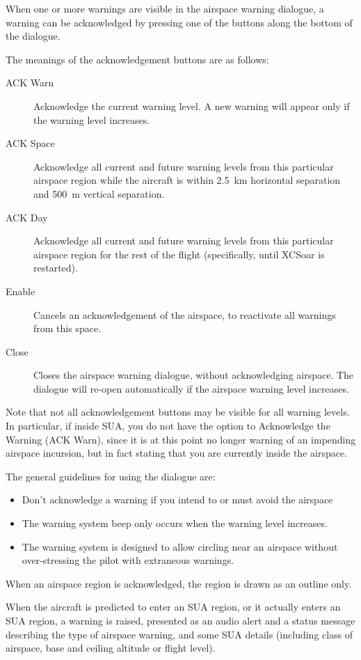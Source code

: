 When one or more warnings are visible in the airspace warning dialogue,
a warning can be acknowledged by pressing one of the buttons along the bottom
of the dialogue.

The meanings of the acknowledgement buttons are as follows:
\begin{description}
\item[ACK Warn]  Acknowledge the current warning level.  A new warning will appear
only if the warning level increases.
\item[ACK Space]  Acknowledge all current and future warning levels from this 
particular airspace region while the aircraft is within 2.5~km horizontal separation
and 500~m vertical separation.
\item[ACK Day]  Acknowledge all current and future warning levels from this particular
airspace region for the rest of the flight (specifically, until XCSoar
is restarted).
\item[Enable]  Cancels an acknowledgement of the airspace, to reactivate all warnings
from this space.
\item[Close] Closes the airspace warning dialogue, without acknowledging airspace.
  The dialogue will re-open automatically if the airspace warning level increases.
\end{description}

Note that not all acknowledgement buttons may be visible for all
warning levels.  In particular, if inside SUA, you do not have the
option to Acknowledge the Warning (ACK Warn), since it is at this
point no longer warning of an impending airspace incursion, but in
fact stating that you are currently inside the airspace.

The general guidelines for using the dialogue are:
\begin{itemize}
\item  Don't acknowledge a warning if you intend to or must avoid the airspace
\item  The warning system beep only occurs when the warning level increases.
\item  The warning system is designed to allow circling near an airspace without
  over-stressing the pilot with extraneous warnings.
\end{itemize}

When an airspace region is acknowledged, the region is drawn as an
outline only.

When the aircraft is predicted to enter an SUA region, or it actually
enters an SUA region, a warning is raised, presented as an audio alert
and a status message describing the type of airspace warning, and some SUA
details (including class of airspace, base and ceiling altitude or
flight level).

